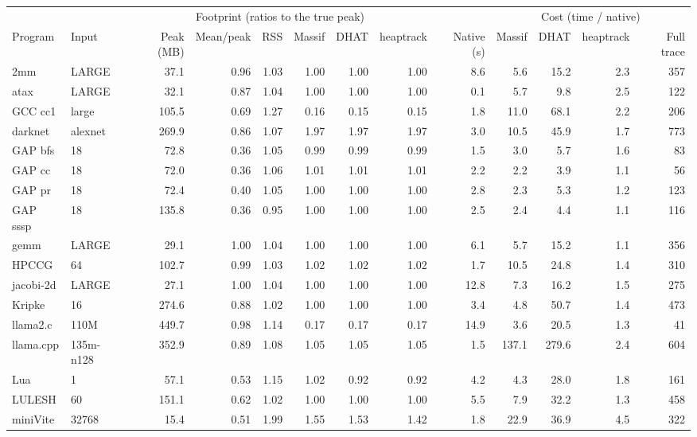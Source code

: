 \begin{tabular}{llrrrrrrrrrrr}
\toprule
 & & \multicolumn{6}{c}{Footprint (ratios to the true peak)} & & \multicolumn{4}{c}{Cost (time / native)} \\
\cmidrule(lr){3-8} \cmidrule(lr){10-13}
Program & Input & Peak (MB) & Mean/peak & RSS & Massif & DHAT & heaptrack & Native (s) & Massif & DHAT & heaptrack & Full trace \\
\midrule
2mm & LARGE & 37.1 & 0.96 & 1.03 & 1.00 & 1.00 & 1.00 & 8.6 & 5.6 & 15.2 & 2.3 & 357 \\
atax & LARGE & 32.1 & 0.87 & 1.04 & 1.00 & 1.00 & 1.00 & 0.1 & 5.7 & 9.8 & 2.5 & 122 \\
GCC cc1 & large & 105.5 & 0.69 & 1.27 & 0.16 & 0.15 & 0.15 & 1.8 & 11.0 & 68.1 & 2.2 & 206 \\
darknet & alexnet & 269.9 & 0.86 & 1.07 & 1.97 & 1.97 & 1.97 & 3.0 & 10.5 & 45.9 & 1.7 & 773 \\
GAP bfs & 18 & 72.8 & 0.36 & 1.05 & 0.99 & 0.99 & 0.99 & 1.5 & 3.0 & 5.7 & 1.6 & 83 \\
GAP cc & 18 & 72.0 & 0.36 & 1.06 & 1.01 & 1.01 & 1.01 & 2.2 & 2.2 & 3.9 & 1.1 & 56 \\
GAP pr & 18 & 72.4 & 0.40 & 1.05 & 1.00 & 1.00 & 1.00 & 2.8 & 2.3 & 5.3 & 1.2 & 123 \\
GAP sssp & 18 & 135.8 & 0.36 & 0.95 & 1.00 & 1.00 & 1.00 & 2.5 & 2.4 & 4.4 & 1.1 & 116 \\
gemm & LARGE & 29.1 & 1.00 & 1.04 & 1.00 & 1.00 & 1.00 & 6.1 & 5.7 & 15.2 & 1.1 & 356 \\
HPCCG & 64 & 102.7 & 0.99 & 1.03 & 1.02 & 1.02 & 1.02 & 1.7 & 10.5 & 24.8 & 1.4 & 310 \\
jacobi-2d & LARGE & 27.1 & 1.00 & 1.04 & 1.00 & 1.00 & 1.00 & 12.8 & 7.3 & 16.2 & 1.5 & 275 \\
Kripke & 16 & 274.6 & 0.88 & 1.02 & 1.00 & 1.00 & 1.00 & 3.4 & 4.8 & 50.7 & 1.4 & 473 \\
llama2.c & 110M & 449.7 & 0.98 & 1.14 & 0.17 & 0.17 & 0.17 & 14.9 & 3.6 & 20.5 & 1.3 & 41 \\
llama.cpp & 135m-n128 & 352.9 & 0.89 & 1.08 & 1.05 & 1.05 & 1.05 & 1.5 & 137.1 & 279.6 & 2.4 & 604 \\
Lua & 1 & 57.1 & 0.53 & 1.15 & 1.02 & 0.92 & 0.92 & 4.2 & 4.3 & 28.0 & 1.8 & 161 \\
LULESH & 60 & 151.1 & 0.62 & 1.02 & 1.00 & 1.00 & 1.00 & 5.5 & 7.9 & 32.2 & 1.3 & 458 \\
miniVite & 32768 & 15.4 & 0.51 & 1.99 & 1.55 & 1.53 & 1.42 & 1.8 & 22.9 & 36.9 & 4.5 & 322 \\

\end{tabular}
